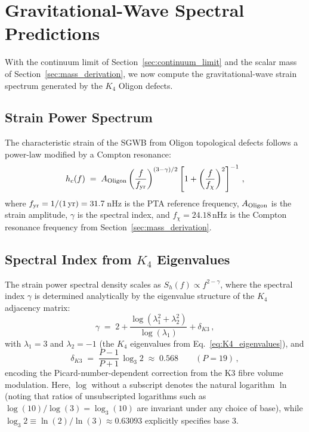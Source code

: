 \section{Gravitational-Wave Spectral Predictions}
\label{sec:gw_predictions}

With the continuum limit of Section~\ref{sec:continuum_limit} and the scalar mass of Section~\ref{sec:mass_derivation}, we now compute the gravitational-wave strain spectrum generated by the $K_4$ Oligon defects.

\subsection{Strain Power Spectrum}

The characteristic strain of the SGWB from Oligon topological defects follows a power-law modified by a Compton resonance:
\begin{equation}
    h_c(f) \;=\; A_{\rm Oligon} \left(\frac{f}{f_{\rm yr}}\right)^{(3-\gamma)/2} \left[1 + \left(\frac{f}{f_\chi}\right)^2\right]^{-1}\,,
    \label{eq:hc_spectrum}
\end{equation}
where $f_{\rm yr} = 1/(1\,\mathrm{yr}) = 31.7\,$nHz is the PTA reference frequency, $A_{\rm Oligon}$ is the strain amplitude, $\gamma$ is the spectral index, and $f_\chi = 24.18\,$nHz is the Compton resonance frequency from Section~\ref{sec:mass_derivation}.

\subsection{Spectral Index from $K_4$ Eigenvalues}
\label{subsec:spectral_index}

The strain power spectral density scales as $S_h(f) \propto f^{2-\gamma}$, where the spectral index $\gamma$ is determined analytically by the eigenvalue structure of the $K_4$ adjacency matrix:
\begin{equation}
    \gamma \;=\; 2 + \frac{\log(\lambda_1^2 + \lambda_2^2)}{\log(\lambda_1)} + \delta_{K3}\,,
    \label{eq:spectral_index}
\end{equation}
with $\lambda_1 = 3$ and $\lambda_2 = -1$ (the $K_4$ eigenvalues from Eq.~\eqref{eq:K4_eigenvalues}), and
\begin{equation}
    \delta_{K3} \;=\; \frac{P-1}{P+1}\, \log_3 2 \;\approx\; 0.568\qquad (P = 19)\,,
    \label{eq:delta_K3}
\end{equation}
encoding the Picard-number-dependent correction from the K3 fibre volume modulation. Here, $\log$ without a subscript denotes the natural logarithm $\ln$ (noting that ratios of unsubscripted logarithms such as $\log(10)/\log(3) = \log_3(10)$ are invariant under any choice of base), while $\log_3 2 \equiv \ln(2)/\ln(3) \approx 0.63093$ explicitly specifies base 3.

